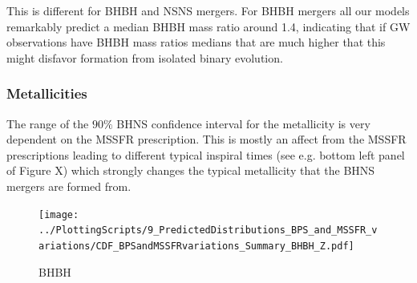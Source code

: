 \documentclass[twocolumn]{aastex63}
\newcommand\bhnsSingle{BHNS\xspace}
\newcommand{\Msun}{\ensuremath{\,\rm{M}_{\odot}}\xspace}
\begin{document}
This is different for BHBH and NSNS mergers. For BHBH mergers all our models remarkably predict a median BHBH mass ratio around 1.4, indicating that if \ac{GW} observations have BHBH mass ratios medians that are much higher that this might disfavor formation from isolated binary evolution. 



\subsubsection{Metallicities}
The range of the $90\%$ \bhnsSingle confidence interval for the metallicity is very dependent on the \ac{MSSFR} prescription. This is mostly an affect from the \ac{MSSFR} prescriptions leading to different typical inspiral times (see e.g. bottom left panel of Figure X) which strongly changes the typical metallicity that  the \bhnsSingle mergers are formed from. 




%

%



%
\begin{figure}
    \centering
\texttt{[image: ../PlottingScripts/9\_PredictedDistributions\_BPS\_and\_MSSFR\_variations/CDF\_BPSandMSSFRvariations\_Summary\_BHBH\_Z.pdf]} %
\caption{BHBH}
    \label{fig:ConfidenceINtervals_BHBH}
\end{figure}
%
\end{document}
